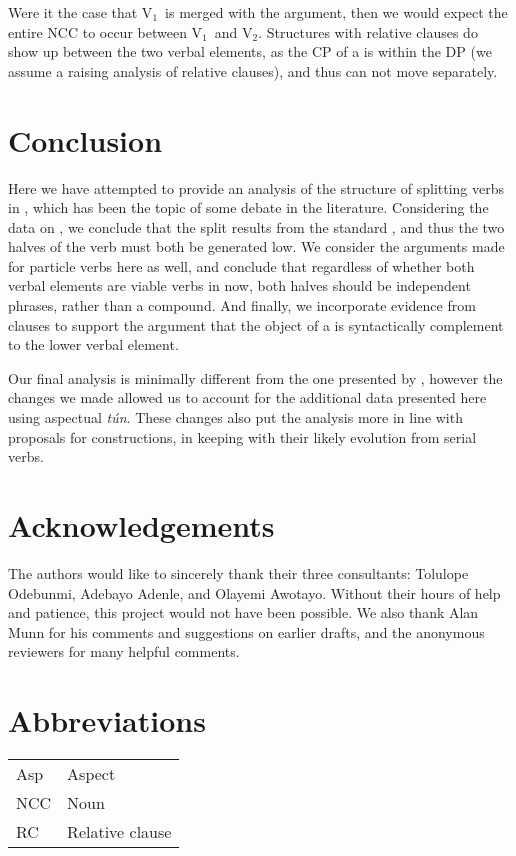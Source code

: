 \documentclass[output=paper,newtxmath,modfonts,nonflat,draftmode]{langsci/langscibook}
\begin{document}
Were it the case that V$_{1}$\ is merged with the argument, then we would expect the entire NCC to occur between V$_{1}$\ and V$_{2}$. 
Structures with relative clauses do show up between the two verbal elements, as the CP of a  is within the DP (we assume a raising analysis of relative clauses), and thus can not move separately.

\section{Conclusion}
\label{sect:parrish:conclusion}

Here we have attempted to provide an analysis of the structure of splitting verbs in , which has been the topic of some debate in the literature. Considering the data on , we conclude that the split results from the standard  , and thus the two halves of the verb must both be generated low. We consider the arguments made for particle verbs here as well, and conclude that regardless of whether both verbal elements are viable verbs in  now, both halves should be independent phrases, rather than a compound. And finally, we incorporate evidence from   clauses to support the argument that the object of a  is syntactically complement to the lower verbal element.

Our final analysis is minimally different from the one presented by \citet{Bode2007}, however the changes we made allowed us to account for the additional data presented here using aspectual \textit{tún}. These changes also put the analysis more in line with proposals for  constructions, in keeping with their likely evolution from serial verbs.

\section*{Acknowledgements}
The authors would like to sincerely thank their three consultants: Tolulope Odebunmi, Adebayo Adenle, and Olayemi Awotayo. Without their hours of help and patience, this project would not have been possible. We also thank Alan Munn for his comments and suggestions on earlier drafts, and the anonymous reviewers for many helpful comments.

\section*{Abbreviations} 
	
	\begin{tabular}{ll}   
		Asp & Aspect \\
		NCC & Noun \isi{complement clause} \\
		RC & Relative clause \\ 
	\end{tabular}
	 

 
\printbibliography[heading=subbibliography,notkeyword=this]
\end{document}
